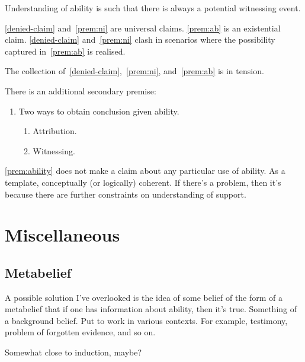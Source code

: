 Understanding of ability is such that there is always a potential witnessing event.

\ref{denied-claim} and~\ref{prem:ni} are universal claims.
\ref{prem:ab} is an existential claim.
\ref{denied-claim} and~\ref{prem:ni} clash in scenarios where the possibility captured in~\ref{prem:ab} is realised.

The collection of~\ref{denied-claim},~\ref{prem:ni}, and~\ref{prem:ab} is in tension.

There is an additional secondary premise:

\begin{note}
\begin{enumerate}
\item\label{prem:ability} Two ways to obtain conclusion given ability.
  \begin{enumerate}
  \item Attribution.
  \item Witnessing.
  \end{enumerate}
\end{enumerate}

\ref{prem:ability} does not make a claim about any particular use of ability.
As a template, conceptually (or logically) coherent.
If there's a problem, then it's because there are further constraints on understanding of support.
\end{note}

\section{Miscellaneous}
\label{sec:misc}

\subsection{Metabelief}
\label{sec:metabelief}

\begin{note}[Idea]
  A possible solution I've overlooked is the idea of some belief of the form of a metabelief that if one has information about ability, then it's true.
  Something of a background belief.
  Put to work in various contexts.
  For example, testimony, problem of forgotten evidence, and so on.

  Somewhat close to induction, maybe?
\end{note}

